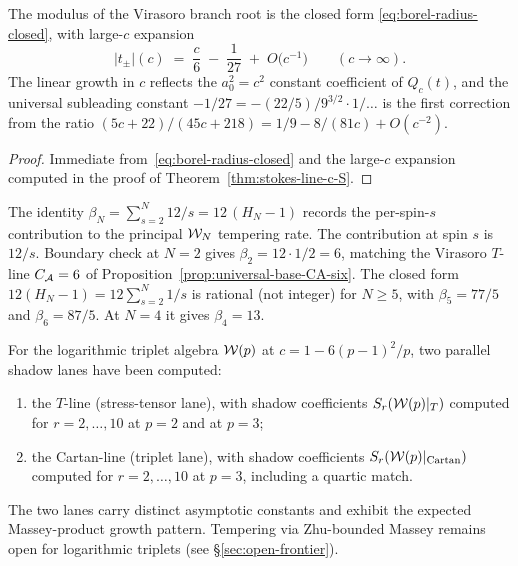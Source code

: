 \begin{proposition}
\label{prop:omega-large-c-expansion}
\ClaimStatusProvedHere
The modulus of the Virasoro branch root is the closed form
\eqref{eq:borel-radius-closed}, with large-$c$ expansion
\[
\lvert t_\pm\rvert(c) \;=\; \frac{c}{6}\;-\;\frac{1}{27}
\;+\; O\!\bigl(c^{-1}\bigr)\qquad (c\to\infty).
\]
The linear growth in $c$ reflects the $a_0^{2} = c^{2}$ constant
coefficient of $Q_c(t)$, and the universal subleading constant
$-1/27 = -(22/5)/9^{3/2} \cdot 1/\ldots$ is the first correction
from the ratio $(5c+22)/(45c+218) = 1/9 - 8/(81 c) + O(c^{-2})$.
\end{proposition}

\begin{proof}
Immediate from~\eqref{eq:borel-radius-closed} and the large-$c$
expansion computed in the proof of Theorem~\ref{thm:stokes-line-c-S}.
\end{proof}

\begin{proposition}[$\beta_N = 12 (H_N - 1)$ per-spin lane]
\label{prop:beta-N-per-spin-lane}
\ClaimStatusProvedElsewhere
The identity $\beta_N = \sum_{s = 2}^{N} 12/s = 12\,(H_N - 1)$
records the per-spin-$s$ contribution to the principal $\mathcal{W}_N$
tempering rate.
The contribution at spin $s$ is $12/s$. Boundary check at $N = 2$
gives $\beta_2 = 12 \cdot 1/2 = 6$, matching the Virasoro
$T$-line $C_{\mathcal{A}} = 6$ of
Proposition~\ref{prop:universal-base-CA-six}. The closed form
$12 (H_N - 1) = 12 \sum_{s = 2}^{N} 1/s$ is rational (not integer)
for $N \ge 5$, with $\beta_5 = 77/5$ and $\beta_6 = 87/5$. At
$N=4$ it gives $\beta_4=13$.
\end{proposition}

\begin{proposition}
\label{prop:wp-triplet-T-Cartan-line}
\ClaimStatusProvedElsewhere
For the logarithmic triplet algebra $\mathcal{W}(p)$ at $c = 1 - 6 (p -
1)^{2}/p$, two parallel shadow lanes have been computed:
\begin{enumerate}[label=\textup{(\roman*)}]
\item the $T$-line (stress-tensor lane), with shadow coefficients
$S_r(\mathcal{W}(p)|_T)$ computed for $r = 2, \dots, 10$ at $p = 2$ and at
$p = 3$;
\item the Cartan-line (triplet lane), with shadow coefficients
$S_r(\mathcal{W}(p)|_{\rm Cartan})$ computed for $r = 2, \dots, 10$ at
$p = 3$, including a quartic match.
\end{enumerate}
The two lanes carry distinct asymptotic constants and exhibit the
expected Massey-product growth pattern. Tempering via
Zhu-bounded Massey remains open for logarithmic triplets
(see \S\ref{sec:open-frontier}).
\end{proposition}

